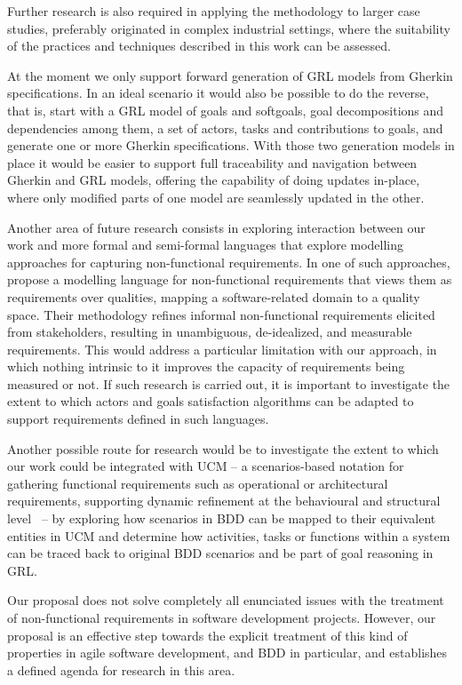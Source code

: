 \documentclass[dissertation,final]{softeng}
\newcommand{\nfrs}{non-functional requirements\xspace}
\begin{document}
Further research is also required in applying the methodology to larger case studies, preferably originated in complex industrial settings, where the suitability of the practices and techniques described in this work can be assessed.

At the moment we only support forward generation of GRL models from Gherkin specifications. In an ideal scenario it would also be possible to do the reverse, that is, start with a GRL model of goals and softgoals, goal decompositions and dependencies among them, a set of actors, tasks and contributions to goals, and generate one or more Gherkin specifications. With those two generation models in place it would be easier to support full traceability and navigation between Gherkin and GRL models, offering the capability of doing updates in-place, where only modified parts of one model are seamlessly updated in the other.

Another area of future research consists in exploring interaction between our work and more formal and semi-formal languages that explore modelling approaches for capturing \nfrs. In one of such approaches, \citet{MylopoulosOnt2014} propose a modelling language for non-functional requirements that views them as requirements over qualities, mapping a software-related domain to a quality space. Their methodology refines informal \nfrs elicited from stakeholders, resulting in unambiguous, de-idealized, and measurable requirements. This would address a particular limitation with our approach, in which nothing intrinsic to it improves the capacity of requirements being measured or not. If such research is carried out, it is important to investigate the extent to which actors and goals satisfaction algorithms can be adapted to support requirements defined in such languages.

Another possible route for research would be to investigate the extent to which our work could be integrated with UCM -- a scenarios-based notation for gathering functional requirements such as operational or architectural requirements, supporting dynamic refinement at the behavioural and structural level~\citep{Roy:2007wyba} -- by exploring how scenarios in BDD can be mapped to their equivalent entities in UCM and determine how activities, tasks or functions within a system can be traced back to original BDD scenarios and be part of goal reasoning in GRL.

Our proposal does not solve completely all enunciated issues with the treatment of non-functional requirements in software development projects. However, our proposal is an effective step towards the explicit treatment of this kind of properties in agile software development, and BDD in particular, and establishes a defined agenda for research in this area.
\end{document}

